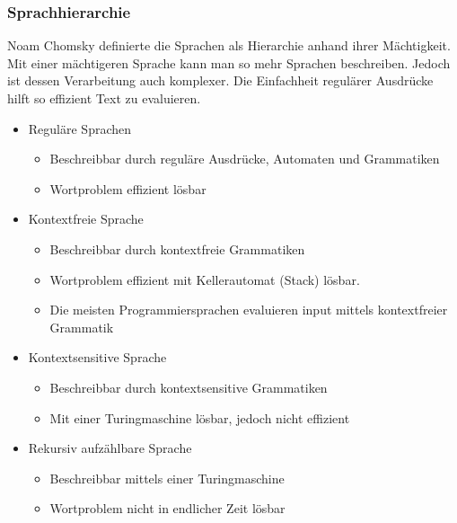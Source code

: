 \documentclass{article}
\begin{document}
	\subsubsection{Sprachhierarchie}
	\label{sec:Sprachhierarchie}
	Noam Chomsky definierte die Sprachen als Hierarchie anhand ihrer Mächtigkeit. Mit einer mächtigeren Sprache kann man so mehr Sprachen beschreiben. Jedoch ist dessen Verarbeitung auch komplexer. Die Einfachheit regulärer Ausdrücke hilft so effizient Text zu evaluieren.
	\begin{itemize}
		\item{Reguläre Sprachen}
		\begin{itemize}
			\item{Beschreibbar durch reguläre Ausdrücke, Automaten und Grammatiken}
			\item{Wortproblem effizient lösbar}
		\end{itemize}
		\item{Kontextfreie Sprache}
		\begin{itemize}
			\item{Beschreibbar durch kontextfreie Grammatiken}
			\item{Wortproblem effizient mit Kellerautomat (Stack) lösbar.}
			\item{Die meisten Programmiersprachen evaluieren input mittels kontextfreier Grammatik}
		\end{itemize}
		\item{Kontextsensitive Sprache}
		\begin{itemize}
			\item{Beschreibbar durch kontextsensitive Grammatiken}
			\item{Mit einer Turingmaschine lösbar, jedoch nicht effizient}
		\end{itemize}
		\item{Rekursiv aufzählbare Sprache}
		\begin{itemize}
			\item{Beschreibbar mittels einer Turingmaschine}
			\item{Wortproblem nicht in endlicher Zeit lösbar}
		\end{itemize}
	\end{itemize}
\end{document}
